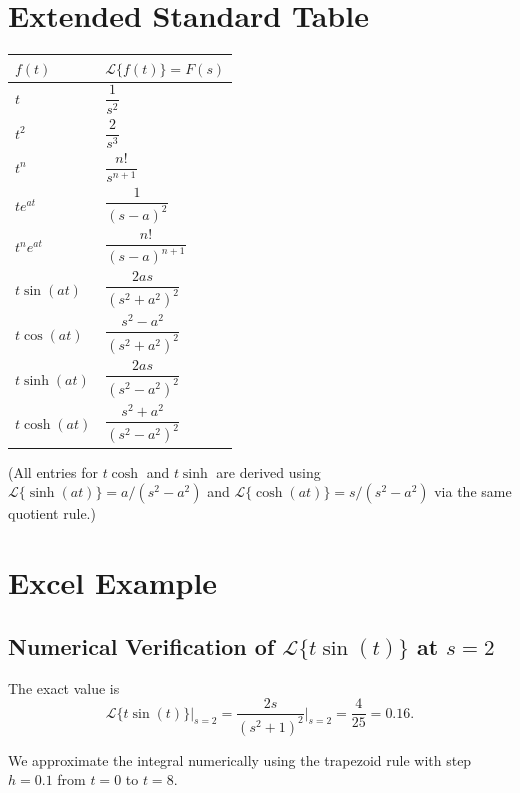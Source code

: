 \documentclass[12pt,a4paper]{article}
\begin{document}
\section{Extended Standard Table}
\begin{center}
\begin{tabular}{@{}l l@{}}
\toprule
\textbf{$f(t)$} & \textbf{$\mathcal{L}\{f(t)\} = F(s)$} \\
\midrule
$t$ & $\dfrac{1}{s^2}$ \\[6pt]
$t^2$ & $\dfrac{2}{s^3}$ \\[6pt]
$t^n$ & $\dfrac{n!}{s^{n+1}}$ \\[6pt]
$te^{at}$ & $\dfrac{1}{(s-a)^2}$ \\[6pt]
$t^n e^{at}$ & $\dfrac{n!}{(s-a)^{n+1}}$ \\[6pt]
$t\sin(at)$ & $\dfrac{2as}{(s^2+a^2)^2}$ \\[6pt]
$t\cos(at)$ & $\dfrac{s^2-a^2}{(s^2+a^2)^2}$ \\[6pt]
$t\sinh(at)$ & $\dfrac{2as}{(s^2-a^2)^2}$ \\[6pt]
$t\cosh(at)$ & $\dfrac{s^2+a^2}{(s^2-a^2)^2}$ \\[6pt]
\bottomrule
\end{tabular}
\end{center}

\noindent
(All entries for $t\cosh$ and $t\sinh$ are derived using
$\mathcal{L}\{\sinh(at)\}=a/(s^2-a^2)$ and
$\mathcal{L}\{\cosh(at)\}=s/(s^2-a^2)$ via the same quotient rule.)

\section{Excel Example}
\subsection*{Numerical Verification of $\mathcal{L}\{t\sin(t)\}$ at $s=2$}

The exact value is
\[
  \mathcal{L}\{t\sin(t)\}\big|_{s=2}
  = \frac{2s}{(s^2+1)^2}\bigg|_{s=2}
  = \frac{4}{25} = 0.16.
\]

We approximate the integral numerically using the trapezoid rule with step
$h=0.1$ from $t=0$ to $t=8$.
\end{document}
